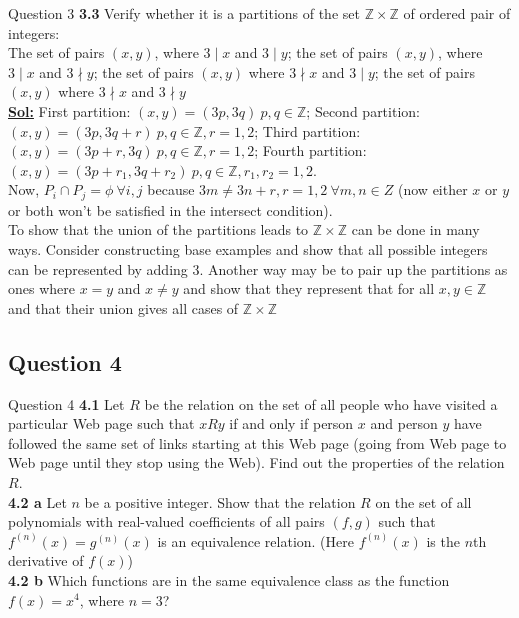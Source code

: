 \documentclass[xcolor=svgnames]{beamer}
\begin{document}
\begin{frame}{Question 3}
    \textbf{3.3} Verify whether it is a partitions of the set $\mathbb{Z}\times\mathbb{Z}$ of ordered pair of integers: \\
    The set of pairs $(x, y)$, where $3 \mid x$ and $3 \mid y$; the set of pairs $(x,y)$, where $3 \mid x$ and $3 \nmid y$; the set of pairs $(x, y)$ where $3 \nmid x$ and $3 \mid y$; the set of pairs $(x,y)$ where $3 \nmid x$ and $3 \nmid y$
    \\\textbf{\underline{Sol:}} First partition: $(x,y) = (3p, 3q)\ p, q \in \mathbb{Z}$; Second partition: $(x, y) = (3p, 3q + r)\ p, q \in \mathbb{Z}, r = 1, 2$; Third partition: $(x, y) = (3p + r, 3q)\ p, q \in \mathbb{Z}, r= 1, 2$; Fourth partition: $(x, y) = (3p + r_1, 3q + r_2)\ p, q \in \mathbb{Z}, r_1,r_2 = 1, 2$. \\ 
    Now, $P_i \cap P_j = \phi\ \forall i, j$ because $3m \neq 3n + r, r=1,2\  \forall m, n \in Z$ (now either $x$ or $y$ or both won't be satisfied in the intersect condition).\\
    To show that the union of the partitions leads to $\mathbb{Z}\times\mathbb{Z}$ can be done in many ways. Consider constructing base examples and show that all possible integers can be represented by adding $3$. Another way may be to pair up the partitions as ones where $x = y$ and $x \neq y$ and show that they represent that for all $x, y \in \mathbb{Z}$ and that their union gives all cases of $\mathbb{Z}\times\mathbb{Z}$
\end{frame}

\subsection{Question 4}

\begin{frame}{Question 4}
    \textbf{4.1} Let $R$ be the relation on the set of all people who have visited a particular Web page such that $xRy$ if and only if person $x$ and person $y$ have followed the same set of links starting at this Web page (going from Web page to Web page until they stop using the Web). Find out the properties of the relation $R$. \\ 
    \vspace{4mm}
    \textbf{4.2 a} Let $n$ be a positive integer. Show that the relation $R$ on the set of all polynomials with real-valued coefficients of all pairs $(f, g)$ such that $f^{(n)}(x) = g^{(n)}(x)$ is an equivalence relation. (Here $f^{(n)}(x)$ is the $n$th derivative of $f(x)$) \\ 
    \textbf{4.2 b} Which functions are in the same equivalence class as the function $f(x) = x^4$, where $n = 3$?
\end{frame}
\end{document}
